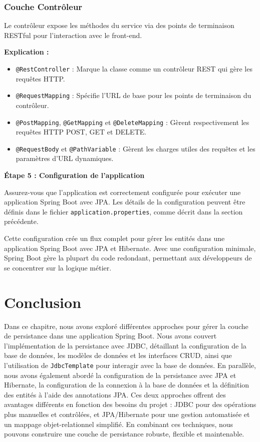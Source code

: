 \documentclass{article}
\begin{document}
\subsubsection{Couche Contrôleur}

Le contrôleur expose les méthodes du service via des points de terminaison RESTful pour l'interaction avec le front-end.

\textbf{Explication :}
\begin{itemize}
    \item \texttt{@RestController} : Marque la classe comme un contrôleur REST qui gère les requêtes HTTP.
    \item \texttt{@RequestMapping} : Spécifie l'URL de base pour les points de terminaison du contrôleur.
    \item \texttt{@PostMapping}, \texttt{@GetMapping} et \texttt{@DeleteMapping} : Gèrent respectivement les requêtes HTTP POST, GET et DELETE.
    \item \texttt{@RequestBody} et \texttt{@PathVariable} : Gèrent les charges utiles des requêtes et les paramètres d'URL dynamiques.
\end{itemize}

\textbf{Étape 5 : Configuration de l'application}

Assurez-vous que l'application est correctement configurée pour exécuter une application Spring Boot avec JPA. Les détails de la configuration peuvent être définis dans le fichier \texttt{application.properties}, comme décrit dans la section précédente.

Cette configuration crée un flux complet pour gérer les entités dans une application Spring Boot avec JPA et Hibernate. Avec une configuration minimale, Spring Boot gère la plupart du code redondant, permettant aux développeurs de se concentrer sur la logique métier.

\section{Conclusion}

Dans ce chapitre, nous avons exploré différentes approches pour gérer la couche de persistance dans une application Spring Boot. Nous avons couvert l'implémentation de la persistance avec JDBC, détaillant la configuration de la base de données, les modèles de données et les interfaces CRUD, ainsi que l'utilisation de \texttt{JdbcTemplate} pour interagir avec la base de données. En parallèle, nous avons également abordé la configuration de la persistance avec JPA et Hibernate, la configuration de la connexion à la base de données et la définition des entités à l'aide des annotations JPA. Ces deux approches offrent des avantages différents en fonction des besoins du projet : JDBC pour des opérations plus manuelles et contrôlées, et JPA/Hibernate pour une gestion automatisée et un mappage objet-relationnel simplifié. En combinant ces techniques, nous pouvons construire une couche de persistance robuste, flexible et maintenable.
\end{document}
